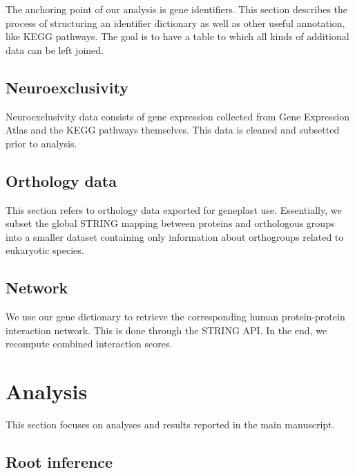 \documentclass[
]{article}
\begin{document}
The anchoring point of our analysis is gene identifiers. This section
describes the process of structuring an identifier dictionary as well as
other useful annotation, like KEGG pathways. The goal is to have a table
to which all kinds of additional data can be left joined.


\hypertarget{neuroexclusivity}{%
\subsection{Neuroexclusivity}\label{neuroexclusivity}}

Neuroexclusivity data consists of gene expression collected from Gene
Expression Atlas and the KEGG pathways themselves. This data is cleaned
and subsetted prior to analysis. 

\hypertarget{orthology-data}{%
\subsection{Orthology data}\label{orthology-data}}

This section refers to orthology data exported for geneplast use.
Essentially, we subset the global STRING mapping between proteins and
orthologous groups into a smaller dataset containing only information
about orthogroups related to eukaryotic species.


\hypertarget{network}{%
\subsection{Network}\label{network}}

We use our gene dictionary to retrieve the corresponding human
protein-protein interaction network. This is done through the STRING
API. In the end, we recompute combined interaction scores.


\hypertarget{analysis}{%
\section{Analysis}\label{analysis}}

This section focuses on analyses and results reported in the main
manuscript.

\hypertarget{root-inference}{%
\subsection{Root inference}\label{root-inference}}
\end{document}
